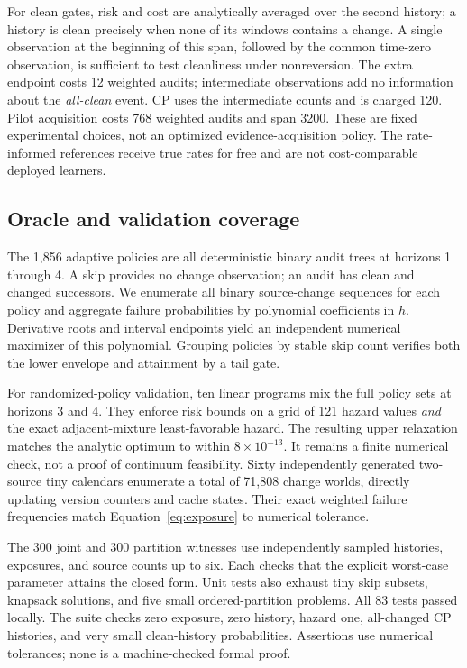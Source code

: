 For clean gates, risk and cost are analytically averaged over the second history; a history is clean precisely when none of its windows contains a change. A single observation at the beginning of this span, followed by the common time-zero observation, is sufficient to test cleanliness under nonreversion. The extra endpoint costs 12 weighted audits; intermediate observations add no information about the \emph{all-clean} event. CP uses the intermediate counts and is charged 120. Pilot acquisition costs 768 weighted audits and span 3200. These are fixed experimental choices, not an optimized evidence-acquisition policy. The rate-informed references receive true rates for free and are not cost-comparable deployed learners.

\subsection{Oracle and validation coverage}
The 1,856 adaptive policies are all deterministic binary audit trees at horizons 1 through 4. A skip provides no change observation; an audit has clean and changed successors. We enumerate all binary source-change sequences for each policy and aggregate failure probabilities by polynomial coefficients in $h$. Derivative roots and interval endpoints yield an independent numerical maximizer of this polynomial. Grouping policies by stable skip count verifies both the lower envelope and attainment by a tail gate.

For randomized-policy validation, ten linear programs mix the full policy sets at horizons 3 and 4. They enforce risk bounds on a grid of 121 hazard values \emph{and} the exact adjacent-mixture least-favorable hazard. The resulting upper relaxation matches the analytic optimum to within $8\times10^{-13}$. It remains a finite numerical check, not a proof of continuum feasibility. Sixty independently generated two-source tiny calendars enumerate a total of 71,808 change worlds, directly updating version counters and cache states. Their exact weighted failure frequencies match Equation~\eqref{eq:exposure} to numerical tolerance.

The 300 joint and 300 partition witnesses use independently sampled histories, exposures, and source counts up to six. Each checks that the explicit worst-case parameter attains the closed form. Unit tests also exhaust tiny skip subsets, knapsack solutions, and five small ordered-partition problems. All 83 tests passed locally. The suite checks zero exposure, zero history, hazard one, all-changed CP histories, and very small clean-history probabilities. Assertions use numerical tolerances; none is a machine-checked formal proof.

